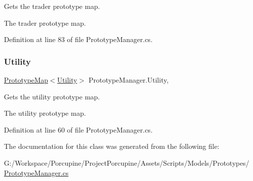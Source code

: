 Gets the trader prototype map. 

The trader prototype map.

Definition at line 83 of file Prototype\+Manager.\+cs.

\mbox{\label{class_prototype_manager_a0628717a2cce375062112062d2200435}} 
\subsubsection{\texorpdfstring{Utility}{Utility}}
{\footnotesize\ttfamily \hyperlink{class_prototype_map}{Prototype\+Map}$<$\hyperlink{class_utility}{Utility}$>$ Prototype\+Manager.\+Utility\hspace{0.3cm}{\ttfamily [static]}, {\ttfamily [get]}}



Gets the utility prototype map. 

The utility prototype map.

Definition at line 60 of file Prototype\+Manager.\+cs.



The documentation for this class was generated from the following file\+:\begin{DoxyCompactItemize}
\item 
G\+:/\+Workspace/\+Porcupine/\+Project\+Porcupine/\+Assets/\+Scripts/\+Models/\+Prototypes/\hyperlink{_prototype_manager_8cs}{Prototype\+Manager.\+cs}\end{DoxyCompactItemize}
